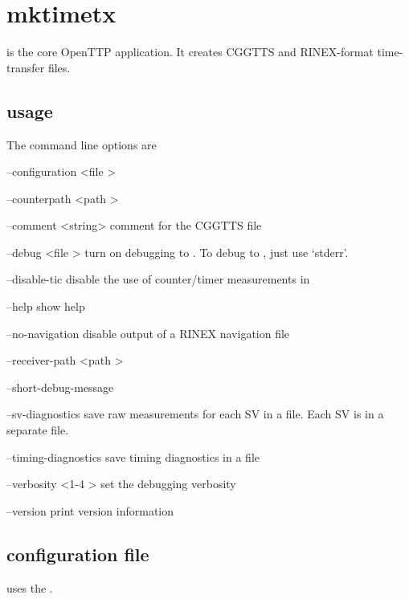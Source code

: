 
\section{mktimetx}

 is the core OpenTTP application.
It creates CGGTTS and RINEX-format time-transfer files.

\subsection{usage}

The command line options are
\begin{description*}
	\item[--configuration \textless file \textgreater] 
	\item[--counterpath \textless path \textgreater]	
	\item[--comment \textless string>] comment for the CGGTTS file	
	\item[--debug \textless file \textgreater]	turn on debugging to . To debug to , just use `stderr'.
	\item[--disable-tic] disable the use of counter/timer measurements in 
	\item[--help] show help
	\item[--no-navigation] disable output of a RINEX navigation file
	\item[--receiver-path \textless path \textgreater]
	\item[--short-debug-message]
	\item[--sv-diagnostics] save raw measurements for each SV in a file. Each SV is in a separate file.
	\item[--timing-diagnostics] save timing diagnostics in a file
	\item[--verbosity \textless 1-4 \textgreater] set the debugging verbosity
	\item[--version] print version information	
\end{description*}

\subsection{configuration file}

 uses the .

